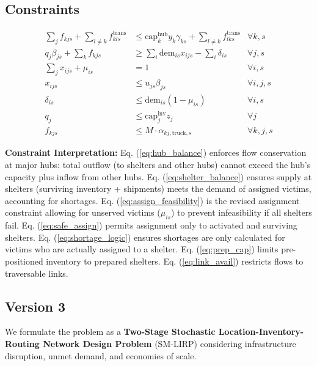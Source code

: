 \subsection{Constraints}

\begin{align}
    \sum_{j} f_{kjs} + \sum_{l \neq k} f_{kls}^{\text{trans}} & \le \text{cap}_k^{\text{hub}} y_k \gamma_{ks} + \sum_{l \neq k} f_{lks}^{\text{trans}} & \forall k, s \label{eq:hub_balance} \\
    q_j \beta_{js} + \sum_{k} f_{kjs} & \ge \sum_{i} \text{dem}_{is} x_{ijs} - \sum_{i} \delta_{is} & \forall j, s \label{eq:shelter_balance} \\
    \sum_{j} x_{ijs} + \mu_{is} & = 1 & \forall i, s \label{eq:assign_feasibility} \\
    x_{ijs} & \le u_{js} \beta_{js} & \forall i, j, s \label{eq:safe_assign} \\
    \delta_{is} & \le \text{dem}_{is} (1-\mu_{is}) & \forall i, s \label{eq:shortage_logic} \\
    q_j & \le \text{cap}_j^{\text{inv}} z_j & \forall j \label{eq:prep_cap} \\
    f_{kjs} & \le M \cdot \alpha_{kj, \text{truck}, s} & \forall k, j, s \label{eq:link_avail}
\end{align}

\noindent \textbf{Constraint Interpretation:}
Eq. (\ref{eq:hub_balance}) enforces flow conservation at major hubs: total outflow (to shelters and other hubs) cannot exceed the hub's capacity plus inflow from other hubs.
Eq. (\ref{eq:shelter_balance}) ensures supply at shelters (surviving inventory + shipments) meets the demand of assigned victims, accounting for shortages.
Eq. (\ref{eq:assign_feasibility}) is the revised assignment constraint allowing for unserved victims ($\mu_{is}$) to prevent infeasibility if all shelters fail.
Eq. (\ref{eq:safe_assign}) permits assignment only to activated and surviving shelters.
Eq. (\ref{eq:shortage_logic}) ensures shortages are only calculated for victims who are actually assigned to a shelter.
Eq. (\ref{eq:prep_cap}) limits pre-positioned inventory to prepared shelters.
Eq. (\ref{eq:link_avail}) restricts flows to traversable links.

\subsection{Version 3}
We formulate the problem as a \textbf{Two-Stage Stochastic Location-Inventory-Routing Network Design Problem} (SM-LIRP) considering infrastructure disruption, unmet demand, and economies of scale.

